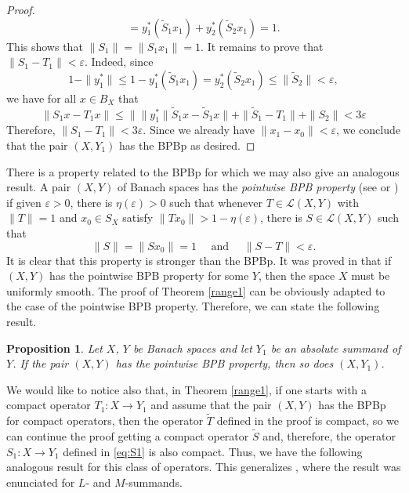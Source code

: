 \documentclass[10pt,a4paper]{amsart}
\theoremstyle{plain}
\newtheorem{prop}[theorem]{Proposition}
\theoremstyle{definition}
\newcommand{\eps}{\varepsilon}
\renewcommand{\leq}{\leqslant}
\begin{document}
\begin{proof}
\begin{equation*}
= y_1^*(\widetilde{S}_1x_1) +  y_2^*(\widetilde{S}_2x_1) = 1.
\end{equation*}
This shows that $\|S_1\| = \|S_1x_1\| = 1$. It remains to prove that $\|S_1 - T_1\| < \eps$. Indeed, since
\begin{equation*}
1 - \|y_1^*\| \leq 1 -  y_1^*(\widetilde{S}_1x_1) =  y_2^*(\widetilde{S}_2x_1) \leq \|\widetilde{S}_2\| < \eps,
\end{equation*}
we have for all $x \in B_X$ that
\begin{equation*}
\|S_1x - T_1x\| \leq \| \|y_1^*\| \widetilde{S}_1x - \widetilde{S}_1x\| + \|\widetilde{S}_1 - T_1\| + \|S_2\| < 3 \eps
\end{equation*}
Therefore, $\|S_1 - T_1\| < 3 \eps$. Since we already have $\|x_1 - x_0\| < \eps$, we conclude that the pair $(X, Y_1)$ has the BPBp as desired.
\end{proof}

There is a property related to the BPBp for which we may also give an analogous result. A  pair $(X, Y)$ of Banach spaces has the \emph{pointwise BPB property} (see \cite[Definition 1.2]{DKL} or \cite[Definition 1.1]{DKKLM}) if given $\eps > 0$, there is $\eta(\eps) > 0$ such that whenever $T \in \mathcal{L}(X, Y)$ with $\|T\| = 1$ and $x_0 \in S_X$ satisfy $\|Tx_0\| > 1 - \eta(\eps)$, there is $S \in \mathcal{L}(X, Y)$ such that
$$
\|S\|=\|Sx_0\| = 1 \quad \text{ and } \quad \|S - T\| < \eps.
$$
It is clear that this property is stronger than the BPBp. It was proved in \cite{DKL} that if $(X, Y)$ has the pointwise BPB property for some $Y$, then the space $X$ must be uniformly smooth. The proof of Theorem \ref{range1} can be obviously adapted to the case of the pointwise BPB property. Therefore, we can state the following result.

\begin{prop} \label{pointwiserange} Let $X$, $Y$ be Banach spaces and let $Y_1$ be an absolute summand of $Y$. If the pair $(X, Y)$ has the pointwise BPB property, then so does $(X, Y_1)$.
\end{prop}

We would like to notice also that, in Theorem \ref{range1}, if one starts with a compact operator $T_1: X \longrightarrow Y_1$ and assume that the pair $(X, Y)$ has the BPBp for compact operators, then the operator $\widetilde{T}$ defined in the proof is compact, so we can continue the proof getting a compact operator $\widetilde{S}$ and, therefore, the operator $S_1: X \longrightarrow Y_1$ defined in \eqref{eq:S1} is also compact. Thus, we have the following analogous result for this class of operators. This generalizes \cite[Lemma 2.6.ii]{DGMM}, where the result was enunciated for $L$- and $M$-summands.
\end{document}
